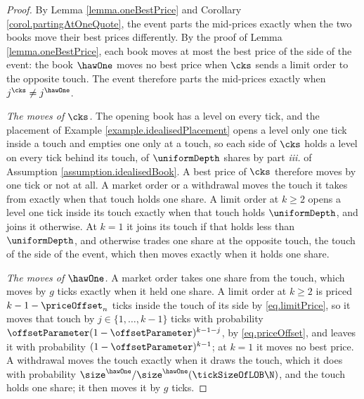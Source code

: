 \begin{proof}
 By Lemma \ref{lemma.oneBestPrice} and Corollary \ref{corol.partingAtOneQuote},
 the event parts the mid-prices exactly when the two books move their best prices
 differently.
 By the proof of Lemma \ref{lemma.oneBestPrice},
 each book moves at most the best price of the side of the event:
 the book $\hawOne$ moves no best price when $\cks$ sends a limit order to the opposite
 touch.
 The event therefore parts the mid-prices exactly when $j^{\cks} \neq j^{\hawOne}$.

 \emph{The moves of $\cks$.}
 The opening book has a level on every tick,
 and the placement of Example \ref{example.idealisedPlacement} opens a level only one tick
 inside a touch and empties one only at a touch,
 so each side of $\cks$ holds a level on every tick behind its touch,
 of $\uniformDepth$ shares by part \emph{iii.} of Assumption \ref{assumption.idealisedBook}.
 A best price of $\cks$ therefore moves by one tick or not at all.
 A market order or a withdrawal moves the touch it takes from
 exactly when that touch holds one share.
 A limit order at $k \geq 2$ opens a level one tick inside its touch
 exactly when that touch holds $\uniformDepth$,
 and joins it otherwise.
 At $k = 1$ it joins its touch if that holds less than $\uniformDepth$,
 and otherwise trades one share at the opposite touch,
 the touch of the side of the event,
 which then moves exactly when it holds one share.

 \emph{The moves of $\hawOne$.}
 A market order takes one share from the touch,
 which moves by $g$ ticks exactly when it held one share.
 A limit order at $k \geq 2$ is priced $k - 1 - \priceOffset_n$ ticks inside the touch of
 its side by \eqref{eq.limitPrice},
 so it moves that touch by $j \in \lbrace 1, \dots, k-1 \rbrace$ ticks with probability
 $\offsetParameter(1-\offsetParameter)^{k-1-j}$, by \eqref{eq.priceOffset},
 and leaves it with probability $(1-\offsetParameter)^{k-1}$;
 at $k = 1$ it moves no best price.
 A withdrawal moves the touch exactly when it draws the touch,
 which it does with probability $\size^{\hawOne}/\size^{\hawOne}(\tickSizeOfLOB\N)$,
 and the touch holds one share;
 it then moves it by $g$ ticks.


\end{proof}
